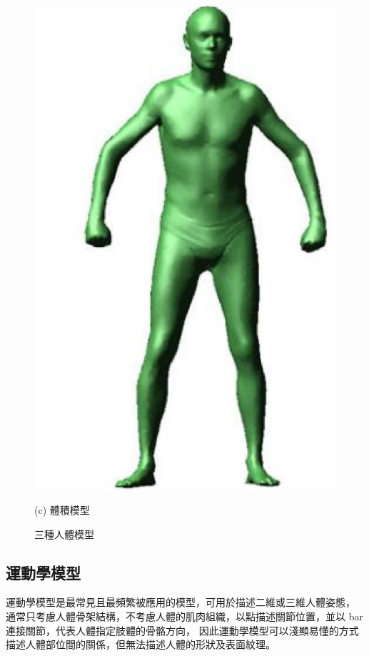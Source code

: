 \begin{figure}[!ht]
\begin{minipage}{.33\textwidth}
      \includegraphics[width=.95\linewidth]{figure/ch2_fig_personal_planar_model.png}
      \caption*{(c) 體積模型}
    \end{minipage}
    \captionsetup{justification=centering}
    \caption[三種人體模型]{三種人體模型}
    \label{ch2_fig_personal_model}
 \end{figure}

\subsection*{運動學模型}
運動學模型是最常見且最頻繁被應用的模型，可用於描述二維或三維人體姿態，
通常只考慮人體骨架結構，不考慮人體的肌肉組織，以點描述關節位置，並以 bar 連接關節，代表人體指定肢體的骨骼方向，
因此運動學模型可以淺顯易懂的方式描述人體部位間的關係，但無法描述人體的形狀及表面紋理。

